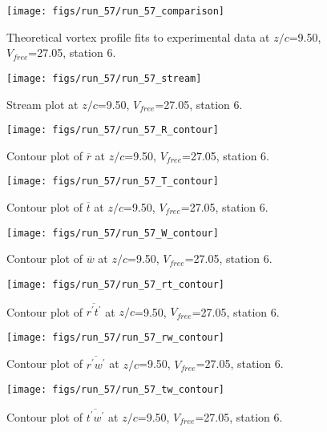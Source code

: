 \begin{figure}[H]
\centering
\texttt{[image: figs/run\_57/run\_57\_comparison]}
\caption{Theoretical vortex profile fits to experimental data at $z/c$=9.50, $V_{free}$=27.05, station 6.}
\label{fig:run_57_comparison}
\end{figure}


\begin{figure}[H]
\centering
\texttt{[image: figs/run\_57/run\_57\_stream]}
\caption{Stream plot at $z/c$=9.50, $V_{free}$=27.05, station 6.}
\label{fig:run_57_stream}
\end{figure}


\begin{figure}[H]
\centering
\texttt{[image: figs/run\_57/run\_57\_R\_contour]}
\caption{Contour plot of $\overline{r}$ at $z/c$=9.50, $V_{free}$=27.05, station 6.}
\label{fig:run_57_R_contour}
\end{figure}


\begin{figure}[H]
\centering
\texttt{[image: figs/run\_57/run\_57\_T\_contour]}
\caption{Contour plot of $\overline{t}$ at $z/c$=9.50, $V_{free}$=27.05, station 6.}
\label{fig:run_57_T_contour}
\end{figure}


\begin{figure}[H]
\centering
\texttt{[image: figs/run\_57/run\_57\_W\_contour]}
\caption{Contour plot of $\overline{w}$ at $z/c$=9.50, $V_{free}$=27.05, station 6.}
\label{fig:run_57_W_contour}
\end{figure}


\begin{figure}[H]
\centering
\texttt{[image: figs/run\_57/run\_57\_rt\_contour]}
\caption{Contour plot of $\overline{r^\prime t^\prime}$ at $z/c$=9.50, $V_{free}$=27.05, station 6.}
\label{fig:run_57_rt_contour}
\end{figure}


\begin{figure}[H]
\centering
\texttt{[image: figs/run\_57/run\_57\_rw\_contour]}
\caption{Contour plot of $\overline{r^\prime w^\prime}$ at $z/c$=9.50, $V_{free}$=27.05, station 6.}
\label{fig:run_57_rw_contour}
\end{figure}


\begin{figure}[H]
\centering
\texttt{[image: figs/run\_57/run\_57\_tw\_contour]}
\caption{Contour plot of $\overline{t^\prime w^\prime}$ at $z/c$=9.50, $V_{free}$=27.05, station 6.}
\label{fig:run_57_tw_contour}
\end{figure}


